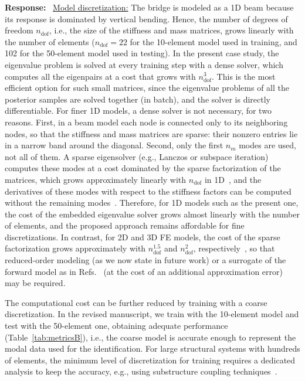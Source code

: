\documentclass[11pt]{article}
\newenvironment{response}{\par\smallskip\noindent\color{resp}\textbf{Response:}\ }{\par}
\begin{document}
\begin{response}
\underline{Model discretization:}
The bridge is modeled as a 1D beam because its response is dominated by vertical bending.
Hence, the number of degrees of freedom $n_{\text{dof}}$, i.e., the size of the stiffness and mass matrices, grows linearly with the number of elements ($n_{\text{dof}}=22$ for the 10-element model used in training, and 102 for the 50-element model used in testing).
In the present case study, the eigenvalue problem is solved at every training step with a dense solver, which computes all the eigenpairs at a cost that grows with $n_{\text{dof}}^3$.
This is the most efficient option for such small matrices, since the eigenvalue problems of all the posterior samples are solved together (in batch), and the solver is directly differentiable.
For finer 1D models, a dense solver is not necessary, for two reasons. First, in a beam model each node is connected only to its neighboring nodes, so that the stiffness and mass matrices are sparse: their nonzero entries lie in a narrow band around the diagonal. Second, only the first $n_m$ modes are used, not all of them.
A sparse eigensolver (e.g., Lanczos or subspace iteration) computes these modes at a cost dominated by the sparse factorization of the matrices, which grows approximately linearly with $n_{\text{dof}}$ in 1D~\cite{george1973nested}, and the derivatives of these modes with respect to the stiffness factors can be computed without the remaining modes~\cite{nelson1976simplified}.
Therefore, for 1D models such as the present one, the cost of the embedded eigenvalue solver grows almost linearly with the number of elements, and the proposed approach remains affordable for fine discretizations.
In contrast, for 2D and 3D FE models, the cost of the sparse factorization grows approximately with $n_{\text{dof}}^{1.5}$ and $n_{\text{dof}}^{2}$, respectively~\cite{george1973nested}, so that reduced-order modeling (as we now state in future work) or a surrogate of the forward model as in Refs.~\cite{Navamuel_wes2025,Arxiv_Navamuel2026copula2d} (at the cost of an additional approximation error) may be required.

The computational cost can be further reduced by training with a coarse discretization.
In the revised manuscript, we train with the 10-element model and test with the 50-element one, obtaining adequate performance (Table~\ref{tab:metricsB}), i.e., the coarse model is accurate enough to represent the modal data used for the identification.
For large structural systems with hundreds of elements, the minimum level of discretization for training requires a dedicated analysis to keep the accuracy, e.g., using substructure coupling techniques~\cite{jensen2019sub}.
\end{response}
\end{document}
